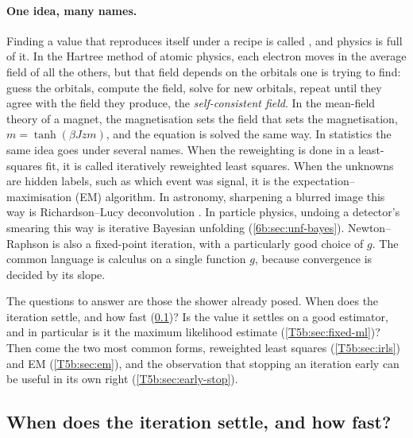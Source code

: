 \paragraph{One idea, many names.}
Finding a value that reproduces itself under a recipe is called
, and physics is full of it. In the
Hartree method of atomic physics, each electron moves in the average field
of all the others, but that field depends on the orbitals one is trying to
find: guess the orbitals, compute the field, solve for new orbitals, repeat
until they agree with the field they produce, the \emph{self-consistent
field}. In the mean-field theory of a magnet, the magnetisation sets the
field that sets the magnetisation, $m=\tanh(\beta Jzm)$, and the equation is
solved the same way. In statistics the same idea goes under several names.
When the reweighting is done in a least-squares fit, it is called
iteratively reweighted least squares. When the unknowns are hidden labels,
such as which event was signal, it is the expectation--maximisation (EM)
algorithm. In astronomy, sharpening a blurred image this way is
Richardson--Lucy deconvolution \cite{Richardson1972,Lucy1974}. In particle
physics, undoing a detector's smearing this way is iterative Bayesian
unfolding (\cref{6b:sec:unf-bayes}). Newton--Raphson is also a fixed-point
iteration, with a particularly good choice of $g$. The common language is
calculus on a single function $g$, because convergence is decided by its
slope.

The questions to answer are those the shower already posed. When does the
iteration settle, and how fast (\cref{T5b:sec:contraction})? Is the value
it settles on a good estimator, and in particular is it the maximum
likelihood estimate (\cref{T5b:sec:fixed-ml})? Then come the two most common
forms, reweighted least squares (\cref{T5b:sec:irls}) and EM
(\cref{T5b:sec:em}), and the observation that stopping an iteration early can
be useful in its own right (\cref{T5b:sec:early-stop}).

\subsection{When does the iteration settle, and how fast?}
\label{T5b:sec:contraction}

